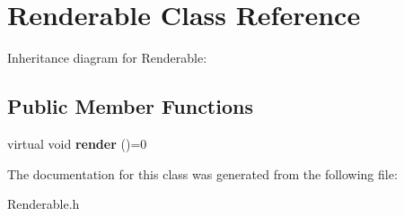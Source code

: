 \hypertarget{classRenderable}{}\section{Renderable Class Reference}
\label{classRenderable}


Inheritance diagram for Renderable\+:
\subsection*{Public Member Functions}
\begin{DoxyCompactItemize}
\item 
virtual void {\bfseries render} ()=0\hypertarget{classRenderable_a7d02709d871bd2bde97d41d933df5adf}{}\label{classRenderable_a7d02709d871bd2bde97d41d933df5adf}

\end{DoxyCompactItemize}


The documentation for this class was generated from the following file\+:\begin{DoxyCompactItemize}
\item 
Renderable.\+h\end{DoxyCompactItemize}
